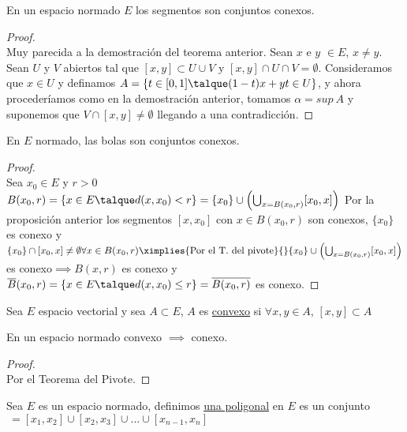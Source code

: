  	\begin{proposicion} En un espacio normado $E$ los segmentos son conjuntos conexos.
 	\begin{proof}\ \\
 		Muy parecida a la demostración del teorema anterior. Sean  $x$ e $y$ $\in E$, $x\neq y$. Sean $U$ y $V$ abiertos tal que $[x,y]\subset U\cup V$ y $[x,y]\cap U\cap V = \emptyset$. Consideramos que $x\in U$ y definamos $A=\{t\in[0,1]\talque (1-t)x+yt\in U\}$, y ahora procederíamos como en la demostración anterior, tomamos $\alpha = sup\ A$ y suponemos que $V\cap [x,y]\neq\emptyset$ llegando a una contradicción.
 	\end{proof}
 	\end{proposicion}

 	\begin{proposicion} En $E$ normado, las bolas son conjuntos conexos.
 	\begin{proof}\ \\
 	Sea $x_0\in E$ y $r>0$\\
 	$B(x_0,r)=\{x\in E\talque d(x,x_0)<r\}=\{x_0\}\cup\left(\bigcup_{x=B(x_0,r)}[x_0,x]\right)$
 	Por la proposición anterior los segmentos $[x,x_0]$ con $x\in B(x_0,r)$ son conexos, $\{x_0\}$ es conexo y $\{x_0\}\cap[x_0,x]\neq\emptyset\\ \forall x\in B(x_0,r)\ximplies{\mathrm{Por\ el\ T.\ del\ pivote}}{}\{x_0\}\cup\left(\bigcup_{x=B(x_0,r)}[x_0,x]\right)$ es conexo$\implies B(x,r)$ es conexo y $\overline{B}(x_0,r)=\{x\in E\talque d(x,x_0)\leq r\} = \overline{B(x_0,r)}$ es conexo.
 	\end{proof}
 	\end{proposicion}
 	
 	\begin{defi} Sea $E$ espacio vectorial y sea $A\subset E$, $A$ es \underline{convexo} si $\forall x,y\in A$, $[x,y]\subset A$
 	\end{defi}
 	
 	\begin{proposicion} En un espacio normado convexo $\implies$ conexo.
 	\begin{proof}\ \\
 	Por el Teorema del Pivote.
 	\end{proof}
 	\end{proposicion}
 	
 	\begin{defi} Sea $E$ es un espacio normado, definimos \underline{una poligonal} en $E$ es un conjunto $\ = [x_1,x_2]\cup[x_2,x_3]\cup...\cup[x_{n-1},x_n]$
 	\end{defi}
 	
